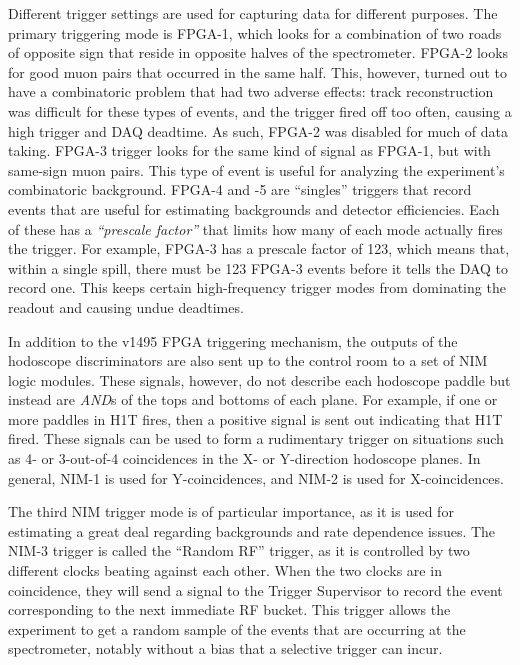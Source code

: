 Different trigger settings are used for capturing data for different purposes. The primary triggering mode is FPGA-1, which looks for a combination of two roads of opposite sign that reside in opposite halves of the spectrometer. FPGA-2 looks for good muon pairs that occurred in the same half. This, however, turned out to have a combinatoric problem that had two adverse effects: track reconstruction was difficult for these types of events, and the trigger fired off too often, causing a high trigger and DAQ deadtime. As such, FPGA-2 was disabled for much of data taking. FPGA-3 trigger looks for the same kind of signal as FPGA-1, but with same-sign muon pairs. This type of event is useful for analyzing the experiment's combinatoric background. FPGA-4 and -5 are ``singles'' triggers that record events that are useful for estimating backgrounds and detector efficiencies. Each of these has a \emph{``prescale factor''} that limits how many of each mode actually fires the trigger. For example, FPGA-3 has a prescale factor of 123, which means that, within a single spill, there must be 123 FPGA-3 events before it tells the DAQ to record one. This keeps certain high-frequency trigger modes from dominating the readout and causing undue deadtimes.

In addition to the v1495 FPGA triggering mechanism, the outputs of the hodoscope discriminators are also sent up to the control room to a set of NIM logic modules. These signals, however, do not describe each hodoscope paddle but instead are \emph{AND}s of the tops and bottoms of each plane. For example, if one or more paddles in H1T fires, then a positive signal is sent out indicating that H1T fired. These signals can be used to form a rudimentary trigger on situations such as 4- or 3-out-of-4 coincidences in the X- or Y-direction hodoscope planes. In general, NIM-1 is used for Y-coincidences, and NIM-2 is used for X-coincidences.

The third NIM trigger mode is of particular importance, as it is used for estimating a great deal regarding backgrounds and rate dependence issues. The NIM-3 trigger is called the ``Random RF'' trigger, as it is controlled by two different clocks beating against each other. When the two clocks are in coincidence, they will send a signal to the Trigger Supervisor to record the event corresponding to the next immediate RF bucket. This trigger allows the experiment to get a random sample of the events that are occurring at the spectrometer, notably without a bias that a selective trigger can incur.

